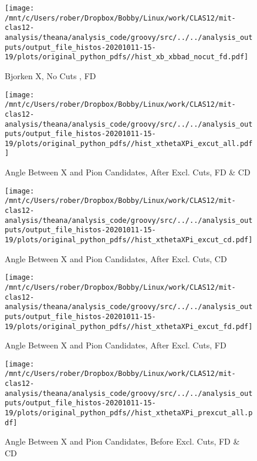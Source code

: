 \documentclass{article}
\begin{document}
\begin{landscape}
    \begin{figure}[h]
        \centering

        \texttt{[image: /mnt/c/Users/rober/Dropbox/Bobby/Linux/work/CLAS12/mit-clas12-analysis/theana/analysis\_code/groovy/src/../../analysis\_outputs/output\_file\_histos-20201011-15-19/plots/original\_python\_pdfs//hist\_xb\_xbbad\_nocut\_fd.pdf]}
        \captionsetup{textformat=empty,labelformat=blank}
        \caption{Bjorken X, No Cuts , FD}
    \end{figure}
    \clearpage
    
    \begin{figure}[h]
        \centering

        \texttt{[image: /mnt/c/Users/rober/Dropbox/Bobby/Linux/work/CLAS12/mit-clas12-analysis/theana/analysis\_code/groovy/src/../../analysis\_outputs/output\_file\_histos-20201011-15-19/plots/original\_python\_pdfs//hist\_xthetaXPi\_excut\_all.pdf]}
        \captionsetup{textformat=empty,labelformat=blank}
        \caption{Angle Between X and Pion Candidates, After Excl. Cuts, FD \& CD}
    \end{figure}
    \clearpage
    
    \begin{figure}[h]
        \centering

        \texttt{[image: /mnt/c/Users/rober/Dropbox/Bobby/Linux/work/CLAS12/mit-clas12-analysis/theana/analysis\_code/groovy/src/../../analysis\_outputs/output\_file\_histos-20201011-15-19/plots/original\_python\_pdfs//hist\_xthetaXPi\_excut\_cd.pdf]}
        \captionsetup{textformat=empty,labelformat=blank}
        \caption{Angle Between X and Pion Candidates, After Excl. Cuts, CD}
    \end{figure}
    \clearpage
    
    \begin{figure}[h]
        \centering

        \texttt{[image: /mnt/c/Users/rober/Dropbox/Bobby/Linux/work/CLAS12/mit-clas12-analysis/theana/analysis\_code/groovy/src/../../analysis\_outputs/output\_file\_histos-20201011-15-19/plots/original\_python\_pdfs//hist\_xthetaXPi\_excut\_fd.pdf]}
        \captionsetup{textformat=empty,labelformat=blank}
        \caption{Angle Between X and Pion Candidates, After Excl. Cuts, FD}
    \end{figure}
    \clearpage
    
    \begin{figure}[h]
        \centering

        \texttt{[image: /mnt/c/Users/rober/Dropbox/Bobby/Linux/work/CLAS12/mit-clas12-analysis/theana/analysis\_code/groovy/src/../../analysis\_outputs/output\_file\_histos-20201011-15-19/plots/original\_python\_pdfs//hist\_xthetaXPi\_prexcut\_all.pdf]}
        \captionsetup{textformat=empty,labelformat=blank}
        \caption{Angle Between X and Pion Candidates, Before Excl. Cuts, FD \& CD}
    \end{figure}
    \clearpage
    

\end{landscape}
\end{document}
